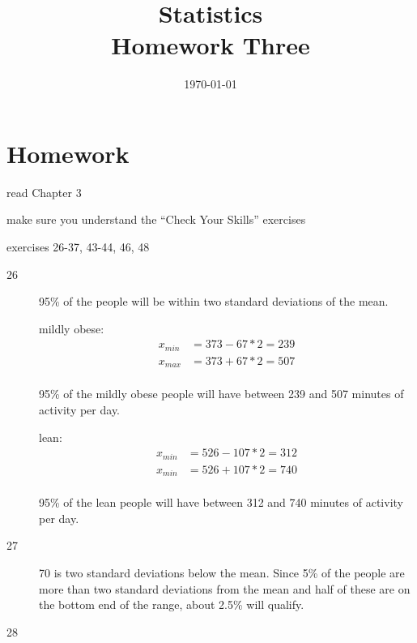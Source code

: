 \documentclass{exam}
\author{}
\date{\today}
\title{Statistics \\ Homework Three}
\begin{document}
  \maketitle

  \section{Homework}
    \begin{itemize*}
      \item read Chapter 3 
      \item make sure you understand the ``Check Your Skills'' exercises
      \item exercises 26-37, 43-44, 46, 48
    \end{itemize*}

  \ifprintanswers
    \begin{description}
      \item[26] 95\% of the people will be within two standard deviations of the mean.  

        mildly obese:
        \begin{align*}
          x_{min} &= 373 - 67 * 2 = 239 \\
          x_{max} &= 373 + 67 * 2 = 507 \\
        \end{align*}

        95\% of the mildly obese people will have between 239 and 507 minutes of activity
        per day.

        lean:
        \begin{align*}
          x_{min} &= 526 - 107 * 2 = 312 \\
          x_{min} &= 526 + 107 * 2 = 740 \\
        \end{align*}

        95\% of the lean people will have between 312 and 740 minutes of activity per day.

      \item[27]
        70 is two standard deviations below the mean.  Since 5\% of the people are more
        than two standard deviations from the mean and half of these are on the bottom end
        of the range, about 2.5\% will qualify. 

      \item[28]


\end{description}
\end{document}
